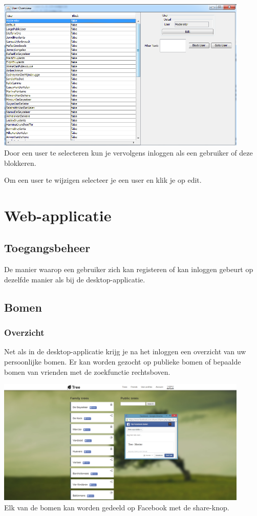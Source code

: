 \documentclass[pdftex,a4paper,12pt,twoside]{report}
\begin{document}
\includegraphics[width=12cm]{images/useroverview.png}\\[.5cm]

Door een user te selecteren kun je vervolgens inloggen als een gebruiker of deze blokkeren.

Om een user te wijzigen selecteer je een user en klik je op edit.


\chapter{Web-applicatie}
\section{Toegangsbeheer}
De manier waarop een gebruiker zich kan registeren of kan inloggen gebeurt op dezelfde manier als bij de desktop-applicatie.
\section{Bomen}
\subsection{Overzicht}
Net als in de desktop-applicatie krijg je na het inloggen een overzicht van uw persoonlijke bomen. Er kan worden gezocht op publieke bomen of bepaalde bomen van vrienden met de zoekfunctie rechtsboven.

\includegraphics[width=12cm]{images/web_treeoverview.png}\\[.5cm]
Elk van de bomen kan worden gedeeld op Facebook met de share-knop.
\end{document}
